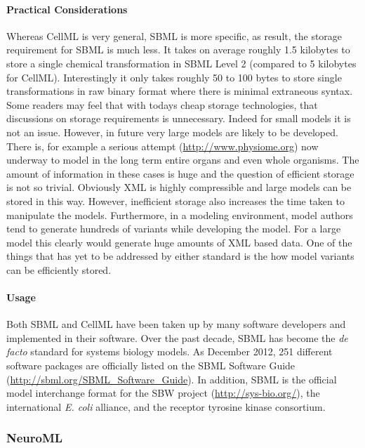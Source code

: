 \paragraph{Practical Considerations}

Whereas CellML is very general, SBML is more specific, as result, the
storage requirement for SBML is much less. It takes on average roughly
1.5 kilobytes to store a single chemical transformation in SBML Level 2
(compared to 5 kilobytes for CellML). Interestingly it only takes
roughly 50 to 100 bytes to store single transformations in raw binary
format where there is minimal extraneous syntax. Some readers may feel
that with todays cheap storage technologies, that discussions on storage
requirements is unnecessary. Indeed for small models it is not an issue.
However, in future very large models are likely to be developed. There
is, for example a serious attempt (\url{http://www.physiome.org}) now
underway to model in the long term entire organs and even whole
organisms. The amount of information in these cases is huge and the
question of efficient storage is not so trivial. Obviously XML is highly
compressible and large models can be stored in this way. However,
inefficient storage also increases the time taken to manipulate the
models. Furthermore, in a modeling environment, model authors tend to
generate hundreds of variants while developing the model. For a large
model this clearly would generate huge amounts of XML based data. One of
the things that has yet to be addressed by either standard is the how
model variants can be efficiently stored.

\paragraph{Usage}

Both SBML and CellML have been taken up by many software developers and
implemented in their software. Over the past decade, SBML has become the
\emph{de facto} standard for systems biology models. As December 2012,
251 different software packages are officially listed on the SBML
Software Guide (\url{http://sbml.org/SBML_Software_Guide}). In addition,
SBML is the official model interchange format for the SBW project
(\url{http://sys-bio.org/}), the international \emph{E. coli} alliance,
and the receptor tyrosine kinase consortium.

\subsubsection{NeuroML}


